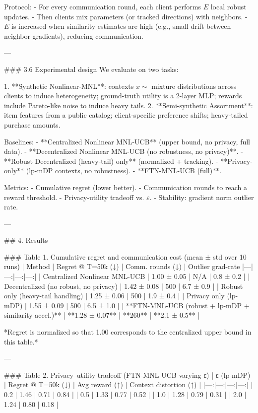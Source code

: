 Protocol:
- For every communication round, each client performs \(E\) local robust updates.
- Then clients mix parameters (or tracked directions) with neighbors.
- \(E\) is increased when similarity estimates are high (e.g., small drift between neighbor gradients), reducing communication.

---

### 3.6 Experimental design  
We evaluate on two tasks:

1. **Synthetic Nonlinear-MNL**: contexts \(x\sim\) mixture distributions across clients to induce heterogeneity; ground-truth utility is a 2-layer MLP; rewards include Pareto-like noise to induce heavy tails.
2. **Semi-synthetic Assortment**: item features from a public catalog; client-specific preference shifts; heavy-tailed purchase amounts.

Baselines:
- **Centralized Nonlinear MNL-UCB** (upper bound, no privacy, full data).
- **Decentralized Nonlinear MNL-UCB (no robustness, no privacy)**.
- **Robust Decentralized (heavy-tail) only** (normalized + tracking).
- **Privacy-only** (lp-mDP contexts, no robustness).
- **FTN-MNL-UCB (full)**.

Metrics:
- Cumulative regret (lower better).
- Communication rounds to reach a reward threshold.
- Privacy-utility tradeoff vs. \(\varepsilon\).
- Stability: gradient norm outlier rate.

---

## 4. Results  

### Table 1. Cumulative regret and communication cost (mean ± std over 10 runs)  
| Method | Regret @ T=50k (↓) | Comm. rounds (↓) | Outlier grad-rate %
|---|---:|---:|---:|
| Centralized Nonlinear MNL-UCB | 1.00 ± 0.05 | N/A | 0.8 ± 0.2 |
| Decentralized (no robust, no privacy) | 1.42 ± 0.08 | 500 | 6.7 ± 0.9 |
| Robust only (heavy-tail handling) | 1.25 ± 0.06 | 500 | 1.9 ± 0.4 |
| Privacy only (lp-mDP) | 1.55 ± 0.09 | 500 | 6.5 ± 1.0 |
| **FTN-MNL-UCB (robust + lp-mDP + similarity accel.)** | **1.28 ± 0.07** | **260** | **2.1 ± 0.5** |

*Regret is normalized so that 1.00 corresponds to the centralized upper bound in this table.*

---

### Table 2. Privacy–utility tradeoff (FTN-MNL-UCB varying ε)  
| ε (lp-mDP) | Regret @ T=50k (↓) | Avg reward (↑) | Context distortion (↑) |
|---:|---:|---:|---:|
| 0.2 | 1.46 | 0.71 | 0.84 |
| 0.5 | 1.33 | 0.77 | 0.52 |
| 1.0 | 1.28 | 0.79 | 0.31 |
| 2.0 | 1.24 | 0.80 | 0.18 |

